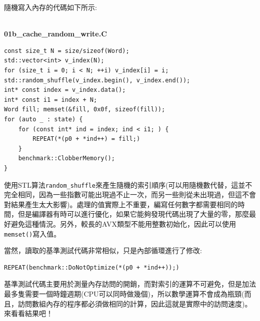 隨機寫入內存的代碼如下所示:

\hspace*{\fill} \\ %
\noindent
\textbf{01b\_cache\_random\_write.C}
\begin{lstlisting}[style=styleCXX]
const size_t N = size/sizeof(Word);
std::vector<int> v_index(N);
for (size_t i = 0; i < N; ++i) v_index[i] = i;
std::random_shuffle(v_index.begin(), v_index.end());
int* const index = v_index.data();
int* const i1 = index + N;
Word fill; memset(&fill, 0x0f, sizeof(fill));
for (auto _ : state) {
	for (const int* ind = index; ind < i1; ) {
		REPEAT(*(p0 + *ind++) = fill;)
	}
	benchmark::ClobberMemory();
}
\end{lstlisting}

使用STL算法\texttt{random\_shuffle}來產生隨機的索引順序(可以用隨機數代替，這並不完全相同，因為一些指數可能出現過不止一次，而另一些則從未出現過，但這不會對結果產生太大影響)。處理的值實際上不重要，編寫任何數字都需要相同的時間，但是編譯器有時可以進行優化，如果它能夠發現代碼出現了大量的零，那麼最好避免這種情況。另外，較長的AVX類型不能用整數初始化，因此可以使用\texttt{memset()}寫入值。

當然，讀取的基準測試代碼非常相似，只是內部循環進行了修改:

\begin{lstlisting}[style=styleCXX]
REPEAT(benchmark::DoNotOptimize(*(p0 + *ind++));)
\end{lstlisting}

基準測試代碼主要用於測量內存訪問的開銷，而對索引的運算不可避免，但是加法最多隻需要一個時鐘週期(CPU可以同時做幾個)，所以數學運算不會成為瓶頸(而且，訪問數組內存的程序都必須做相同的計算，因此這就是實際中的訪問速度)。來看看結果吧！




























